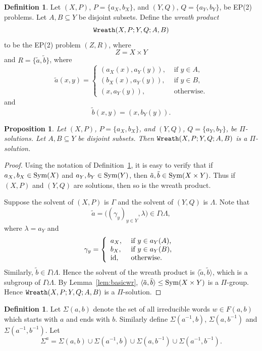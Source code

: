 \documentclass[10pt,a4paper]{amsart}
\newtheorem{proposition}[theorem]{Proposition}
\theoremstyle{definition}
\newtheorem{definition}[theorem]{Definition}
\theoremstyle{definition}
\numberwithin{equation}{section}
\begin{document}
\begin{definition}\label{def:wreath} Let $(X, P)$, $P=\{a_X,b_X\}$, and $(Y, Q)$, $Q=\{a_Y, b_Y\}$, be EP(2) problems. Let $A, B\subseteq Y$ be disjoint subsets. Define the {\em wreath product} $$\mbox{\tt Wreath}(X, P; Y, Q; A, B)$$ to be the EP(2) problem $(Z, R)$, where
$$ Z= X\times Y $$
and
$R=\{\tilde{a}, \tilde{b}\}$, where
$$ \tilde{a}(x, y)=\left\{\begin{array}{ll} (a_X(x), a_Y(y)), & \mbox{ if $y\in A$, } \\ (b_X(x), a_Y(y)), & \mbox{ if $y\in B$,} \\ (x, a_Y(y)), & \mbox{ otherwise.} \end{array}\right. $$
and
$$ \tilde{b}(x,y)=(x, b_Y(y)). $$
\end{definition}

\begin{proposition}\label{prop:wrps} Let $(X, P)$, $P=\{a_X, b_X\}$, and $(Y, Q)$, $Q=\{a_Y, b_Y\}$, be $\Pi$-solutions. Let $A, B\subseteq Y$ be disjoint subsets. Then $\mbox{\tt Wreath}(X, P; Y, Q; A, B)$ is a $\Pi$-solution.
\end{proposition}

\begin{proof} Using the notation of Definition~\ref{def:wreath}, it is easy to verify that if $a_X, b_X\in \mbox{\rm Sym}(X)$ and $a_Y, b_Y\in \mbox{\rm Sym}(Y)$, then $\tilde{a}, \tilde{b}\in \mbox{\rm Sym}(X\times Y)$. Thus if $(X, P)$ and $(Y, Q)$ are solutions, then so is the wreath product. 

Suppose the solvent of $(X, P)$ is $\Gamma$ and the solvent of $(Y, Q)$ is $\Lambda$. Note that
$$ \tilde{a}=\big((\gamma_y)_{y\in Y}, \lambda\big)\in \Gamma\wr\Lambda, $$
where $\lambda=a_Y$ and 
$$ \gamma_y=\left\{\begin{array}{ll} a_X, & \mbox{ if $y\in a_Y(A)$, } \\ b_X, & \mbox{ if $y\in a_Y(B)$,} \\ \mbox{\rm id}, & \mbox{ otherwise.} \end{array}\right. $$
Similarly, $\tilde{b}\in \Gamma\wr\Lambda$. Hence the solvent of the wreath product is $\langle \tilde{a}, \tilde{b}\rangle$, which is a subgroup of $\Gamma\wr\Lambda$. By Lemma~\ref{lem:basicwr}, $\langle \tilde{a}, \tilde{b}\rangle\leq \mbox{\rm Sym}(X\times Y)$ is a $\Pi$-group. Hence $\mbox{\tt Wreath}(X, P; Y, Q; A, B)$ is a $\Pi$-solution.
\end{proof}


\begin{definition} Let $\Sigma(a, b)$ denote the set of all irreducible words $w\in F(a, b)$ which starts with $a$ and ends with $b$. Similarly define $\Sigma(a^{-1}, b)$, $\Sigma(a, b^{-1})$ and $\Sigma(a^{-1}, b^{-1})$. Let 
$$ \Sigma^a=\Sigma(a, b)\cup \Sigma(a^{-1}, b)\cup \Sigma(a, b^{-1})\cup \Sigma(a^{-1}, b^{-1}). $$
\end{definition}
\end{document}
